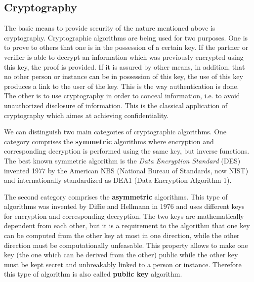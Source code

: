 \subsection{Cryptography}
The basic means to provide security of the nature mentioned above is cryptography.
Cryptographic algorithms are being used for two purposes. One is to prove to others that
one is in the possession of a certain key. If the partner or verifier is able to decrypt
an information which was previously encrypted using this key, the proof is provided.
If it is assured by other means, in addition, that no other person or instance can
be in possession of this key, the use of this key produces a link to the user of the key.
This is the way authentication is done. The other is to use cryptography in order
to conceal information, i.e. to avoid unauthorized disclosure of information.
This is the classical application of cryptography which aimes at achieving confidentiality. 

We can distinguish two main categories of cryptographic algorithms. One category
comprises the {\bf symmetric} algorithms where encryption and corresponding decryption is performed 
using the same key, but inverse functions. The best known symmetric algorithm is the
{\em Data Encryption Standard} (DES) invented 1977 by the American NBS (National Bureau of
Standards, now NIST) and internationally standardized as DEA1 (Data Encryption Algorithm 1).

The second category comprises the {\bf asymmetric} algorithms. This type of algorithms was invented by Diffie and Hellmann in 1976 
and uses different keys for encryption
and corresponding decryption. The two keys are mathematically dependent
from each other, but it is a requirement to the algorithm that one key can be computed 
from the other key at most in one direction, while the other direction must be 
computationally unfeasable. This property allows to make one key 
(the one which can be derived from the other) public while the other key must be kept secret
and unbreakably linked to a person or instance. Therefore this type of algorithm is also
called {\bf public key} algorithm. 

